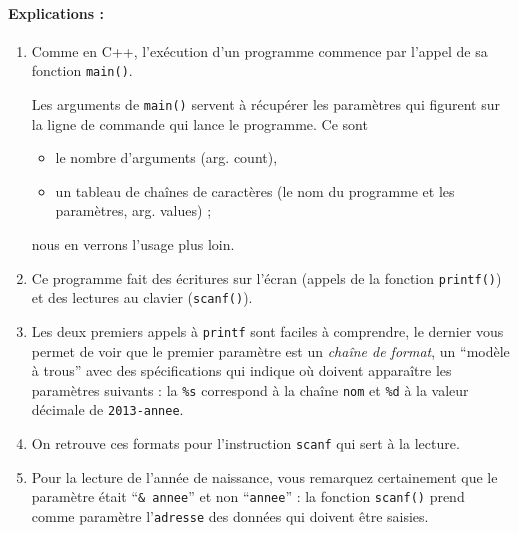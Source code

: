 \documentclass[10pt]{article}
\begin{document}
\paragraph{Explications : } 
\begin{enumerate}
\item Comme en C++, l'exécution d'un programme commence par l'appel de 
sa fonction \texttt{main()}.

 Les arguments de \texttt{main()} servent à récupérer
 les paramètres qui figurent sur la ligne de commande qui lance le 
 programme. Ce sont
 \begin{itemize}
 \item le nombre d'arguments (arg. count),
 \item un tableau de chaînes de caractères (le nom du programme 
 et les paramètres, arg. values) ;
 \end{itemize}
nous en verrons l'usage plus loin.

\item
Ce programme fait des écritures sur l'écran (appels
 de la fonction \texttt{printf()}) et des lectures
au clavier (\texttt{scanf()}).

\item 
Les deux premiers appels à \texttt{printf} sont faciles à comprendre,
le dernier vous permet de voir que le premier paramètre est un
\emph{chaîne de format}, un ``modèle à trous'' avec des spécifications qui indique où doivent apparaître les
paramètres suivants : la  \texttt{\%s} correspond à la
chaîne \texttt{nom} et \texttt{\%d} à la valeur décimale de
\texttt{2013-annee}.

\item 
On retrouve ces formats pour l'instruction \texttt{scanf} qui sert à la lecture.

\item
Pour la lecture de l'année de naissance, vous remarquez certainement
que le paramètre était ``\texttt{\& annee}'' et non ``\texttt{annee}'' :
la fonction \texttt{scanf()} prend comme paramètre l'\texttt{adresse} des données
qui doivent être saisies.


\end{enumerate}
\end{document}
